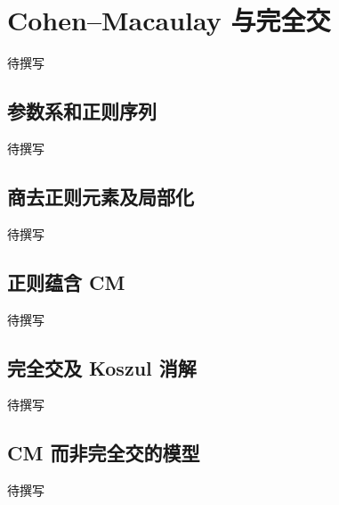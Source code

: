 
% 
% 

\section{Cohen–Macaulay 与完全交}
\label{g5:sec:0903}

待撰写

\subsection{参数系和正则序列}
\label{g5:subsec:0903:01}
待撰写

\subsection{商去正则元素及局部化}
\label{g5:subsec:0903:02}
待撰写

\subsection{正则蕴含 CM}
\label{g5:subsec:0903:03}
待撰写

\subsection{完全交及 Koszul 消解}
\label{g5:subsec:0903:04}
待撰写

\subsection{CM 而非完全交的模型}
\label{g5:subsec:0903:05}
待撰写
